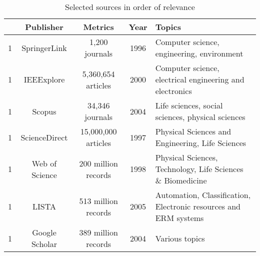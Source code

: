 \begin{table}[h]
  \centering
  \caption{Selected sources in order of relevance}
  \begin{tabularx}{\textwidth}{ccccY}
    \toprule
    \textbf{} & \textbf{Publisher} & \textbf{Metrics}    & \textbf{Year} & \textbf{Topics}                                                  \\
             & SpringerLink       & 1,200 journals      & 1996          & Computer science, engineering, environment                       \\
    1         & IEEExplore         & 5,360,654 articles  & 2000          & Computer science, electrical engineering and electronics         \\
    1         & Scopus             & 34,346 journals     & 2004          & Life sciences, social sciences, physical sciences                \\
    1         & ScienceDirect      & 15,000,000 articles & 1997          & Physical Sciences and Engineering, Life Sciences                 \\
    1         & Web of Science     & 200 million records & 1998          & Physical Sciences, Technology, Life Sciences \& Biomedicine      \\
    1         & LISTA              & 513 million records & 2005          & Automation, Classification, Electronic resources and ERM systems \\
    1         & Google Scholar     & 389 million records & 2004          & Various topics                                                   \\
    \bottomrule
  \end{tabularx}
  \label{tab2:}
\end{table}


\usepackage{xifthen}

\newcommand{\tablestyle}[1]{
  \if{\equal{#1}{box}}{
    \newcommand{\styleBeginTabular}{\begin{tabularx}{\textwidth}{|c|c|c|c|Y|}}
    \newcommand{\styleTopRule}{\hline}
    \newcommand{\styleMidRule}{\hline}
    \newcommand{\styleBottomRule}{\hline}
    \newcommand{\styleRowEnd}{\\\hline}
  }
  \if{\equal{#1}{nobox}}{
    \newcommand{\styleBeginTabular}{\begin{tabularx}{\textwidth}{ccccY}}
    \newcommand{\styleTopRule}{\toprule}
    \newcommand{\styleMidRule}{\midrule}
    \newcommand{\styleBottomRule}{\bottomrule}
    \newcommand{\styleRowEnd}{\\}
  }
}


